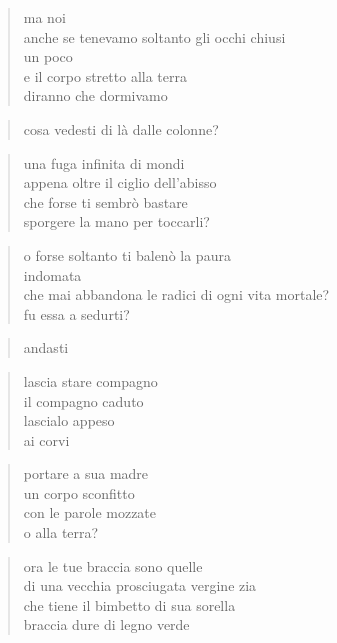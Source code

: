 \begin{verse}
    ma noi\\
    anche se tenevamo soltanto gli occhi chiusi\\
    un poco\\
    e il corpo stretto alla terra\\
    diranno che dormivamo
\end{verse}

\clearpage


\begin{verse}
    cosa vedesti di là dalle colonne?
\end{verse}

\begin{verse}
    una fuga infinita di mondi\\
    appena oltre il ciglio dell'abisso\\
    che forse ti sembrò bastare\\
    sporgere la mano per toccarli?
\end{verse}

\begin{verse}
    o forse soltanto ti balenò la paura\\
    indomata\\
    che mai abbandona le radici di ogni vita mortale?\\
    fu essa a sedurti?
\end{verse}

\begin{verse}
    andasti
\end{verse}

\clearpage


\begin{verse}
    lascia stare compagno\\
    il compagno caduto\\
    lascialo appeso\\
    ai corvi
\end{verse}

\begin{verse}
    portare a sua madre\\
    un corpo sconfitto\\
    con le parole mozzate\\
    o alla terra?
\end{verse}

\begin{verse}
    ora le tue braccia sono quelle\\
    di una vecchia prosciugata vergine zia\\
    che tiene il bimbetto di sua sorella\\
    braccia dure di legno verde
\end{verse}

